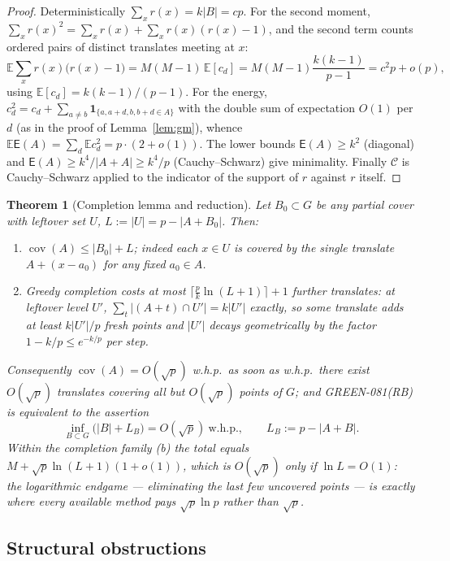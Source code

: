\documentclass[11pt]{article}
\newtheorem{theorem}{Theorem}
\theoremstyle{definition}
\newcommand{\E}{\mathbb{E}}
\newcommand{\cov}{\operatorname{cov}}
\begin{document}
\begin{proof}
Deterministically $\sum_xr(x)=k|B|=cp$. For the second moment,
$\sum_xr(x)^{2}=\sum_xr(x)+\sum_xr(x)(r(x)-1)$, and the second term counts
ordered pairs of distinct translates meeting at $x$:
\[
\E\sum_xr(x)\bigl(r(x)-1\bigr)
=M(M-1)\,\E[c_d]
=M(M-1)\frac{k(k-1)}{p-1}=c^{2}p+o(p),
\]
using $\E[c_d]=k(k-1)/(p-1)$. For the energy,
$c_d^{2}=c_d+\sum_{a\ne b}\mathbf 1_{\{a,a+d,b,b+d\in A\}}$ with the double
sum of expectation $O(1)$ per $d$ (as in the proof of Lemma~\ref{lem:gm}),
whence $\E\mathsf E(A)=\sum_d\E c_d^{2}=p\cdot(2+o(1))$. The lower bounds
$\mathsf E(A)\ge k^{2}$ (diagonal) and
$\mathsf E(A)\ge k^{4}/|A+A|\ge k^{4}/p$ (Cauchy--Schwarz) give minimality.
Finally $\mathcal C$ is Cauchy--Schwarz applied to the indicator of the
support of $r$ against $r$ itself.
\end{proof}

\begin{theorem}[Completion lemma and reduction]\label{thm:reduction}
Let $B_0\subset G$ be any partial cover with leftover set $U$,
$L:=|U|=p-|A+B_0|$. Then:
\begin{enumerate}
\item[(a)] $\cov(A)\le |B_0|+L$; indeed each $x\in U$ is covered by the single
translate $A+(x-a_0)$ for any fixed $a_0\in A$.
\item[(b)] Greedy completion costs at most
$\bigl\lceil\frac pk\ln(L+1)\bigr\rceil+1$ further translates: at leftover
level $U'$, $\sum_{t}|(A+t)\cap U'|=k|U'|$ exactly, so some translate adds at
least $k|U'|/p$ fresh points and $|U'|$ decays geometrically by the factor
$1-k/p\le e^{-k/p}$ per step.
\end{enumerate}
Consequently $\cov(A)=O(\sqrt p)$ w.h.p.\ as soon as w.h.p.\ there exist
$O(\sqrt p)$ translates covering all but $O(\sqrt p)$ points of $G$; and
GREEN-081(RB) is equivalent to the assertion
\[
\inf_{B\subset G}\bigl(|B|+L_B\bigr)=O(\sqrt p)\ \text{w.h.p.},\qquad
L_B:=p-|A+B|.
\]
Within the completion family (b) the total equals
$M+\sqrt p\ln(L+1)(1+o(1))$, which is $O(\sqrt p)$ only if
$\ln L=O(1)$: the logarithmic endgame --- eliminating the last few uncovered
points --- is exactly where every available method pays $\sqrt p\ln p$ rather
than $\sqrt p$.
\end{theorem}

\subsection*{Structural obstructions}
\end{document}
